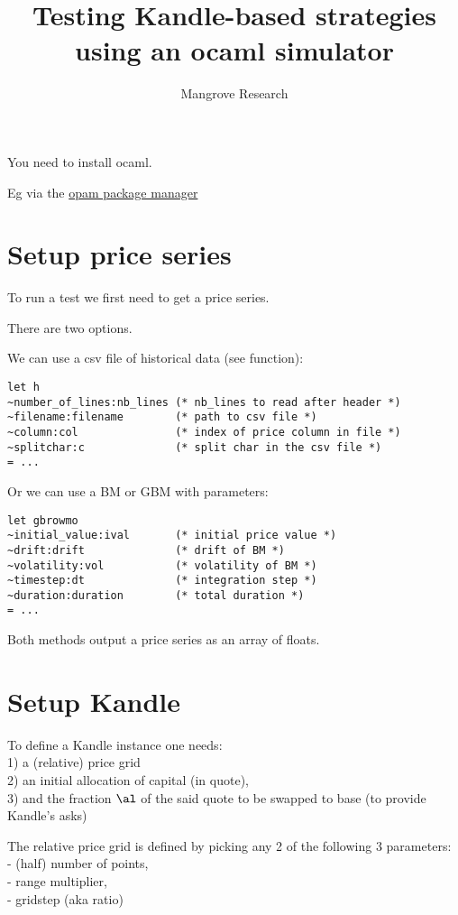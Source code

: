 \documentclass[oneside]{article}
\title{Testing Kandle-based strategies using an ocaml simulator}
\author{Mangrove Research}
\begin{document}
\maketitle

You need to install ocaml. 

Eg via the \href{https://opam.ocaml.org/doc/Install.html}{opam package manager}

\section{Setup price series}

To run a test we first need to get a price series. 

There are two options.

We can use a csv file of historical data (see  function):
\begin{verbatim}
let h 
~number_of_lines:nb_lines (* nb_lines to read after header *)
~filename:filename        (* path to csv file *)
~column:col               (* index of price column in file *)
~splitchar:c              (* split char in the csv file *)
= ...
\end{verbatim}

Or we can use a BM or GBM with parameters:
\begin{verbatim}
let gbrowmo
~initial_value:ival       (* initial price value *)
~drift:drift              (* drift of BM *) 
~volatility:vol           (* volatility of BM *)
~timestep:dt              (* integration step *)
~duration:duration        (* total duration *)
= ...
\end{verbatim}

Both methods output a price series as an array of floats.

\section{Setup Kandle}

To define a Kandle instance one needs:
\\ 1) a (relative) price grid 
\\ 2) an initial allocation of capital (in quote),
\\ 3) and the fraction $\al$ of the said quote to be swapped to base (to provide Kandle's asks)

The relative price grid is defined by picking any 2 of the following 3 parameters: 
\\- (half) number of points, 
\\- range multiplier, 
\\- gridstep (aka ratio)
\end{document}
